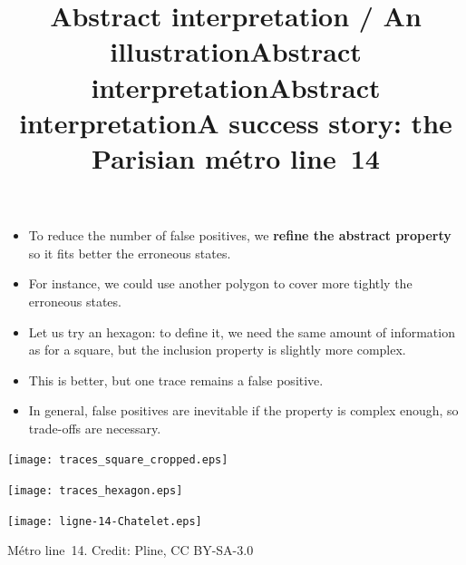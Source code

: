 \documentclass[wide]{slides}
\begin{document}
\begin{slide}
  \title{Abstract interpretation / An illustration}

  \begin{itemize}

    \item To reduce the number of false positives, we \textbf{refine
      the abstract property} so it fits better the erroneous states.

    \item For instance, we could use another polygon to cover more
      tightly the erroneous states.

    \item Let us try an hexagon: to define it, we need the same amount
      of information as for a square, but the inclusion property is
      slightly more complex.

    \item This is better, but one trace remains a false positive.

    \item In general, false positives are inevitable if the property
      is complex enough, so trade\hyp{}offs are necessary.

  \end{itemize}

\end{slide}

\begin{slide}
  \title{Abstract interpretation}

  \begin{center}
    \texttt{[image: traces\_square\_cropped.eps]}
  \end{center}

\end{slide}

\begin{slide}
  \title{Abstract interpretation}

  \begin{center}
    \texttt{[image: traces\_hexagon.eps]}
  \end{center}

\end{slide}

\begin{slide}
  \title{A success story: the Parisian m\'etro line~14}

  \begin{center}
    \texttt{[image: ligne-14-Chatelet.eps]}
  \end{center}

  \centerline{M\'etro line~14. Credit: Pline, CC BY-SA-3.0}

\end{slide}
\end{document}
